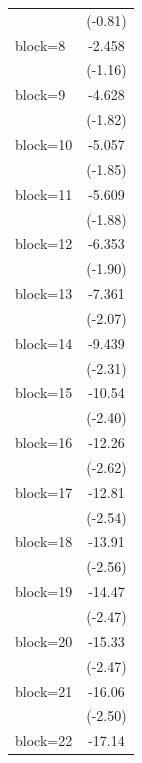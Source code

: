 \documentclass{article}
\begin{document}
{\begin{longtable}{l*{1}{c}}
                    &     (-0.81)         \\
[1em]
block=8             &      -2.458         \\
                    &     (-1.16)         \\
[1em]
block=9             &      -4.628         \\
                    &     (-1.82)         \\
[1em]
block=10            &      -5.057         \\
                    &     (-1.85)         \\
[1em]
block=11            &      -5.609         \\
                    &     (-1.88)         \\
[1em]
block=12            &      -6.353         \\
                    &     (-1.90)         \\
[1em]
block=13            &      -7.361\sym{*}  \\
                    &     (-2.07)         \\
[1em]
block=14            &      -9.439\sym{*}  \\
                    &     (-2.31)         \\
[1em]
block=15            &      -10.54\sym{*}  \\
                    &     (-2.40)         \\
[1em]
block=16            &      -12.26\sym{*}  \\
                    &     (-2.62)         \\
[1em]
block=17            &      -12.81\sym{*}  \\
                    &     (-2.54)         \\
[1em]
block=18            &      -13.91\sym{*}  \\
                    &     (-2.56)         \\
[1em]
block=19            &      -14.47\sym{*}  \\
                    &     (-2.47)         \\
[1em]
block=20            &      -15.33\sym{*}  \\
                    &     (-2.47)         \\
[1em]
block=21            &      -16.06\sym{*}  \\
                    &     (-2.50)         \\
[1em]
block=22            &      -17.14\sym{*}  \\

\end{longtable}}
\end{document}
